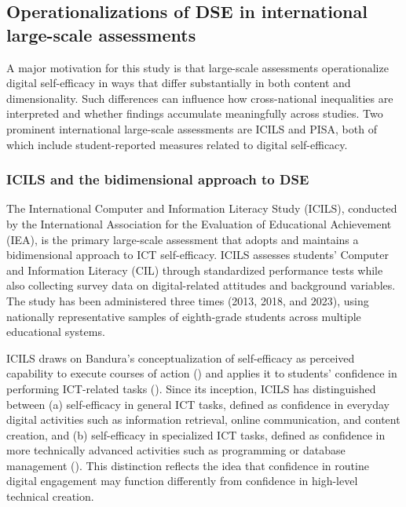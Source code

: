 \documentclass[
  letterpaper,
  DIV=11,
  numbers=noendperiod]{scrartcl}
\begin{document}
\subsection{Operationalizations of DSE in international large-scale
assessments}\label{operationalizations-of-dse-in-international-large-scale-assessments}

A major motivation for this study is that large-scale assessments
operationalize digital self-efficacy in ways that differ substantially
in both content and dimensionality. Such differences can influence how
cross-national inequalities are interpreted and whether findings
accumulate meaningfully across studies. Two prominent international
large-scale assessments are ICILS and PISA, both of which include
student-reported measures related to digital self-efficacy.

\subsubsection{ICILS and the bidimensional approach to
DSE}\label{icils-and-the-bidimensional-approach-to-dse}

The International Computer and Information Literacy Study (ICILS),
conducted by the International Association for the Evaluation of
Educational Achievement (IEA), is the primary large-scale assessment
that adopts and maintains a bidimensional approach to ICT self-efficacy.
ICILS assesses students' Computer and Information Literacy (CIL) through
standardized performance tests while also collecting survey data on
digital-related attitudes and background variables. The study has been
administered three times (2013, 2018, and 2023), using nationally
representative samples of eighth-grade students across multiple
educational systems.

ICILS draws on Bandura's conceptualization of self-efficacy as perceived
capability to execute courses of action
() and applies it to
students' confidence in performing ICT-related tasks
(). Since its
inception, ICILS has distinguished between (a) self-efficacy in general
ICT tasks, defined as confidence in everyday digital activities such as
information retrieval, online communication, and content creation, and
(b) self-efficacy in specialized ICT tasks, defined as confidence in
more technically advanced activities such as programming or database
management ().
This distinction reflects the idea that confidence in routine digital
engagement may function differently from confidence in high-level
technical creation.
\end{document}
